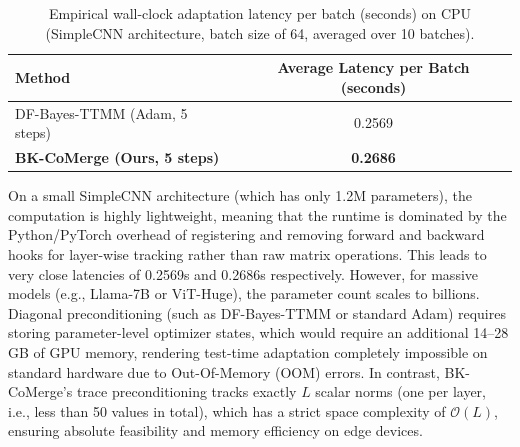 \documentclass{article}
\theoremstyle{plain}
\theoremstyle{definition}
\theoremstyle{remark}
\begin{document}
\begin{table}[h]
\caption{Empirical wall-clock adaptation latency per batch (seconds) on CPU (SimpleCNN architecture, batch size of 64, averaged over 10 batches).}
\label{tab:timing}
\vskip 0.1in
\begin{center}
\begin{small}
\begin{tabular}{lc}
\toprule
Method & Average Latency per Batch (seconds) \\
\midrule
DF-Bayes-TTMM (Adam, 5 steps) & 0.2569 \\
\textbf{BK-CoMerge (Ours, 5 steps)} & \textbf{0.2686} \\
\bottomrule
\end{tabular}
\end{small}
\end{center}
\vskip -0.1in
\end{table}

On a small SimpleCNN architecture (which has only 1.2M parameters), the computation is highly lightweight, meaning that the runtime is dominated by the Python/PyTorch overhead of registering and removing forward and backward hooks for layer-wise tracking rather than raw matrix operations. This leads to very close latencies of 0.2569s and 0.2686s respectively. However, for massive models (e.g., Llama-7B or ViT-Huge), the parameter count scales to billions. Diagonal preconditioning (such as DF-Bayes-TTMM or standard Adam) requires storing parameter-level optimizer states, which would require an additional 14--28 GB of GPU memory, rendering test-time adaptation completely impossible on standard hardware due to Out-Of-Memory (OOM) errors. In contrast, BK-CoMerge's trace preconditioning tracks exactly $L$ scalar norms (one per layer, i.e., less than 50 values in total), which has a strict space complexity of $\mathcal{O}(L)$, ensuring absolute feasibility and memory efficiency on edge devices.
\end{document}
